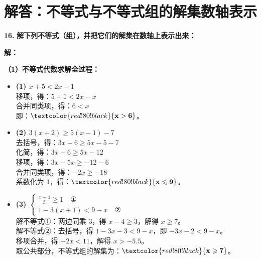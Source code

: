 \section{解答：不等式与不等式组的解集数轴表示}

\vspace{0.6cm}

\textbf{\LARGE 16.} \textbf{解下列不等式（组），并把它们的解集在数轴上表示出来：}

\vspace{0.4cm}
\textbf{解：}

\textbf{（1）不等式代数求解全过程：}

\begin{itemize}
    \item \textbf{(1) $x + 5 < 2x - 1$} \\
    移项，得：$5 + 1 < 2x - x$ \\
    合并同类项，得：$6 < x$ \\
    即：$\textcolor{red!80!black}{\mathbf{x > 6}}$。

    \vspace{0.2cm}
    \item \textbf{(2) $3(x + 2) \geqslant 5(x - 1) - 7$} \\
    去括号，得：$3x + 6 \geqslant 5x - 5 - 7$ \\
    化简，得：$3x + 6 \geqslant 5x - 12$ \\
    移项，得：$3x - 5x \geqslant -12 - 6$ \\
    合并同类项，得：$-2x \geqslant -18$ \\
    系数化为 $1$，得：$\textcolor{red!80!black}{\mathbf{x \leqslant 9}}$。

    \vspace{0.2cm}
    \item \textbf{(3) $\begin{cases} \frac{x - 4}{3} \geqslant 1 \quad \text{①} \\ 1 - 3(x + 1) < 9 - x \quad \text{②} \end{cases}$} \\
    解不等式①：两边同乘 $3$，得 $x - 4 \geqslant 3$，解得 $x \geqslant 7$。 \\
    解不等式②：去括号，得 $1 - 3x - 3 < 9 - x$，即 $-3x - 2 < 9 - x$。 \\
    移项合并，得 $-2x < 11$，解得 $x > -5.5$。 \\
    取公共部分，不等式组的解集为：$\textcolor{red!80!black}{\mathbf{x \geqslant 7}}$。


\end{itemize}
